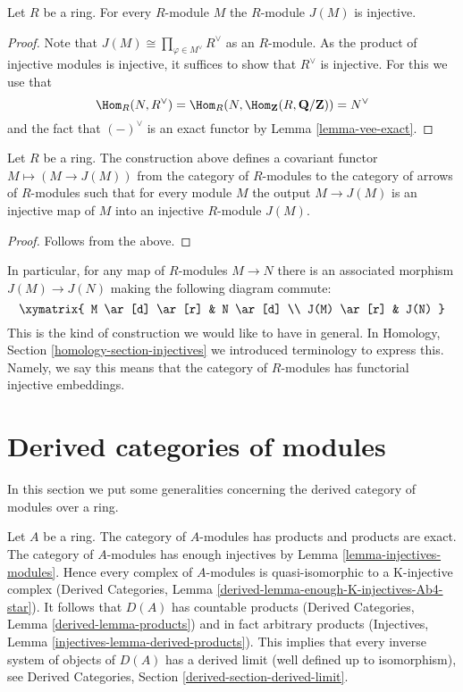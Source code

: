 \begin{lemma}
\label{lemma-JM-injective}
Let $R$ be a ring. For every $R$-module $M$ the
$R$-module $J(M)$ is injective.
\end{lemma}

\begin{proof}
Note that $J(M) \cong \prod_{\varphi \in M^\vee} R^\vee$ as an $R$-module.
As the product of injective modules is injective, it suffices to
show that $R^\vee$ is injective. For this we use that
$$
\Hom_R(N, R^\vee) =
\Hom_R(N, \Hom_{\mathbf{Z}}(R, \mathbf{Q}/\mathbf{Z})) =
N^\vee
$$
and the
fact that $(-)^\vee$ is an exact functor by Lemma
\ref{lemma-vee-exact}.
\end{proof}

\begin{lemma}
\label{lemma-injectives-modules}
Let $R$ be a ring.
The construction above defines a covariant functor
$M \mapsto (M \to J(M))$ from the category of
$R$-modules to the category of arrows of $R$-modules
such that for every module $M$ the output
$M \to J(M)$ is an injective map of $M$ into
an injective $R$-module $J(M)$.
\end{lemma}

\begin{proof}
Follows from the above.
\end{proof}

\noindent
In particular, for any map of $R$-modules $M \to N$
there is an associated morphism $J(M) \to J(N)$
making the following diagram commute:
$$
\xymatrix{
M \ar[d] \ar[r] & N \ar[d] \\
J(M) \ar[r] & J(N) }
$$
This is the kind of construction we would like to have in general.
In Homology, Section \ref{homology-section-injectives}
we introduced terminology to express this. Namely,
we say this means that the category of $R$-modules
has functorial injective embeddings.











\section{Derived categories of modules}
\label{section-derived-modules}

\noindent
In this section we put some generalities concerning the
derived category of modules over a ring.

\medskip\noindent
Let $A$ be a ring. The category of $A$-modules has products and products are
exact. The category of $A$-modules has enough injectives by
Lemma \ref{lemma-injectives-modules}. Hence every complex of $A$-modules
is quasi-isomorphic to a K-injective complex
(Derived Categories, Lemma \ref{derived-lemma-enough-K-injectives-Ab4-star}).
It follows that $D(A)$ has countable products
(Derived Categories, Lemma \ref{derived-lemma-products})
and in fact arbitrary products
(Injectives, Lemma \ref{injectives-lemma-derived-products}).
This implies that every inverse system of objects of $D(A)$
has a derived limit (well defined up to isomorphism), see
Derived Categories, Section \ref{derived-section-derived-limit}.

